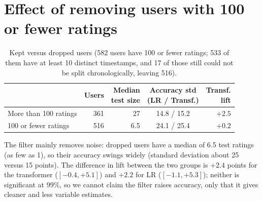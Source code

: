 \documentclass[11pt]{article}
\begin{document}
\section{Effect of removing users with 100 or fewer ratings}
\begin{table}[h]\centering
\small
\begin{tabular}{lrrcr}
\toprule
 & Users & \shortstack{Median\\test size} & \shortstack{Accuracy std\\(LR / Transf.)} & \shortstack{Transf.\\lift} \\
\midrule
More than 100 ratings & 361 & 27 & 14.8 / 15.2 & $+2.5$ \\
100 or fewer ratings & 516 & 6.5 & 24.1 / 25.4 & $+0.2$ \\
\bottomrule
\end{tabular}
\caption{Kept versus dropped users (582 users have 100 or fewer ratings; 533 of them have at least 10 distinct timestamps, and 17 of those still could not be split chronologically, leaving 516).}
\end{table}
The filter mainly removes noise: dropped users have a median of 6.5 test ratings (as few as 1), so their accuracy
swings widely (standard deviation about 25 versus 15 points). The difference in lift between the two groups is
$+2.4$ points for the transformer ($[-0.4, +5.1]$) and $+2.2$ for LR ($[-1.1, +5.3]$); neither is significant at
99\%, so we cannot claim the filter raises accuracy, only that it gives cleaner and less variable estimates.
\end{document}
